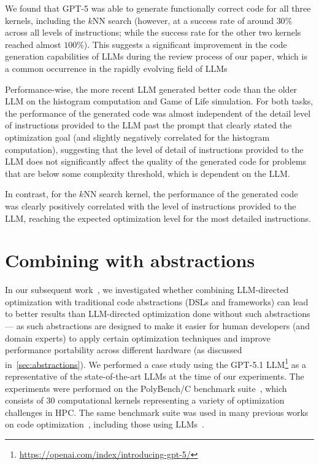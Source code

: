 We found that GPT-5 was able to generate functionally correct code for all three kernels, including the $k$NN search (however, at a success rate of around $30\%$ across all levels of instructions; while the success rate for the other two kernels reached almost $100\%$). This suggests a significant improvement in the code generation capabilities of LLMs during the review process of our paper, which is a common occurrence in the rapidly evolving field of LLMs\@

Performance-wise, the more recent LLM generated better code than the older LLM on the histogram computation and Game of Life simulation. For both tasks, the performance of the generated code was almost independent of the detail level of instructions provided to the LLM past the prompt that clearly stated the optimization goal (and slightly negatively correlated for the histogram computation), suggesting that the level of detail of instructions provided to the LLM does not significantly affect the quality of the generated code for problems that are below some complexity threshold, which is dependent on the LLM\@.

In contrast, for the $k$NN search kernel, the performance of the generated code was clearly positively correlated with the level of instructions provided to the LLM\@, reaching the expected optimization level for the most detailed instructions.


\section{Combining with abstractions}\label{sec:combining-with-abstractions}

In our subsequent work~\cite{klepl2026shifting}, we investigated whether combining LLM-directed optimization with traditional code abstractions (DSLs and frameworks) can lead to better results than LLM-directed optimization done without such abstractions --- as such abstractions are designed to make it easier for human developers (and domain experts) to apply certain optimization techniques and improve performance portability across different hardware (as discussed in~\cref{sec:abstractions}). We performed a case study using the GPT-5.1 LLM\footnote{\url{https://openai.com/index/introducing-gpt-5/}} as a representative of the state-of-the-art LLMs at the time of our experiments. The experiments were performed on the PolyBench/C benchmark suite~\cite{pouchet2012polybench}, which consists of 30 computational kernels representing a variety of optimization challenges in HPC\@. The same benchmark suite was used in many previous works on code optimization~\cite{ansel2014opentuner}, including those using LLMs~\cite{nichols2024performance,merouani2025agentic}.

